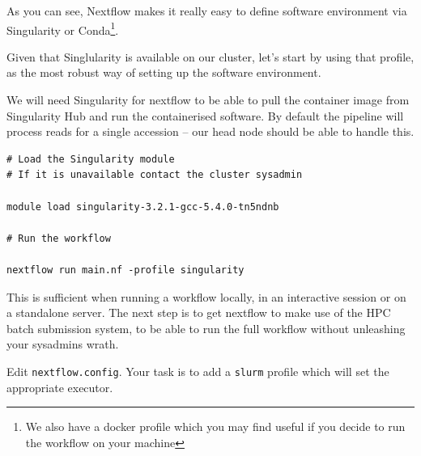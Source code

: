 As you can see, Nextflow makes it really easy to %
define software environment via Singularity or Conda\footnote{We also have a docker profile which you may find useful if you decide to run the workflow on your machine}. 

%



Given that Singlularity is available on our cluster, let's start by using that profile,
as the most robust way of setting up the software environment.



We will need Singularity for nextflow to be able to pull the container image from Singularity Hub and run the containerised software. 
By default the pipeline will process reads for a single accession -- our head node should be able to handle this. 

\begin{steps}
\begin{lstlisting}
# Load the Singularity module 
# If it is unavailable contact the cluster sysadmin

module load singularity-3.2.1-gcc-5.4.0-tn5ndnb

# Run the workflow

nextflow run main.nf -profile singularity
\end{lstlisting}
\end{steps}

This is sufficient when running a workflow locally, in an interactive session or on a standalone server. 
The next step is to get nextflow to make use of the HPC batch submission system, to be able to run the full workflow 
without unleashing your sysadmins wrath.\\ 

\begin{steps}
Edit \texttt{nextflow.config}. Your task is to add a \texttt{slurm} profile which will set the appropriate executor. 
\end{steps}

